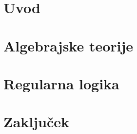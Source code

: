 \documentclass[12pt,a4paper]{book}
\begin{document}
%
\frontmatter

%
\mainmatter
\setcounter{page}{1}
\pagestyle{fancy}
%
\chapter{Uvod}

%
\chapter{Algebrajske teorije}

%
\chapter{Regularna logika}

%
\chapter{Zaključek}

%
\end{document}
